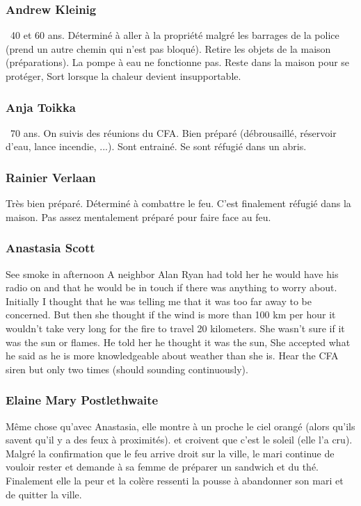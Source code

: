            \subsubsection{Andrew Kleinig}
                ~40 et 60 ans.
                Déterminé à aller à la propriété malgré les barrages de la police (prend un autre chemin qui n'est pas bloqué).
                Retire les objets de la maison (préparations).
                La pompe à eau ne fonctionne pas.
                Reste dans la maison pour se protéger,
                Sort lorsque la chaleur devient insupportable.

            \subsubsection{Anja Toikka}
                ~70 ans.
                On suivis des réunions du CFA.
                Bien préparé (débrousaillé, réservoir d'eau, lance incendie, ...).
                Sont entrainé.
                Se sont réfugié dans un abris.

            \subsubsection{Rainier Verlaan}
                Très bien préparé.
                Déterminé à combattre le feu.
                C'est finalement réfugié dans la maison.
                Pas assez mentalement préparé pour faire face au feu.

            \subsubsection{Anastasia Scott}
                See smoke in afternoon
                A neighbor Alan Ryan had told her he would have his radio on and that he would be in touch if there was anything to worry about.
                Initially I thought that he was telling me that it was too far away to be concerned.
                But then she thought if the wind is more than 100 km per hour it wouldn't take very long for the fire to travel 20 kilometers.
                She wasn't sure if it was the sun or flames. He told her he thought it was the sun,
                She accepted what he said as he is more knowledgeable about weather than she is.
                Hear the CFA siren but only two times (should sounding continuously).

            \subsubsection{Elaine Mary Postlethwaite}
                Même chose qu'avec Anastasia, elle montre à un proche le ciel orangé (alors qu'ils savent qu'il y a des feux à proximités).
                et croivent que c'est le soleil (elle l'a cru).
                Malgré la confirmation que le feu arrive droit sur la ville, le mari continue de vouloir rester et demande à sa femme de
                préparer un sandwich et du thé.
                Finalement elle la peur et la colère ressenti la pousse à abandonner son mari et de quitter la ville.

